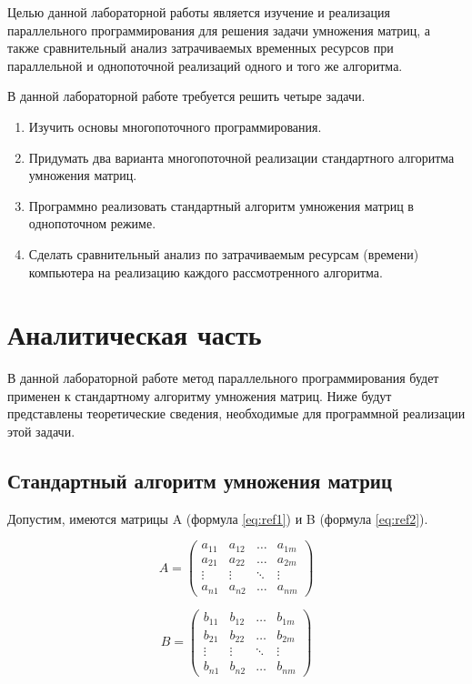 \documentclass[12pt]{report}
\begin{document}
	Целью данной лабораторной работы является изучение и реализация параллельного программирования для решения задачи умножения матриц, а также сравнительный анализ затрачиваемых временных ресурсов при параллельной и однопоточной реализаций одного и того же алгоритма.

В данной лабораторной работе требуется решить четыре задачи.
\begin{enumerate}
\item Изучить основы многопоточного программирования.
\item  Придумать два варианта многопоточной реализации стандартного алгоритма умножения матриц.
\item Программно реализовать стандартный алгоритм умножения матриц в однопоточном режиме.
\item Сделать сравнительный анализ по затрачиваемым ресурсам (времени) компьютера на реализацию каждого рассмотренного алгоритма.
\end{enumerate}


\chapter{Аналитическая часть}
 
 В данной лабораторной работе метод параллельного программирования будет применен к стандартному алгоритму умножения матриц. Ниже будут представлены теоретические сведения, необходимые для программной реализации этой задачи.
 
 \section{Стандартный алгоритм умножения матриц}
 
 Допустим, имеются матрицы A (формула \ref{eq:ref1}) и B (формула \ref{eq:ref2}).
 
 \begin{equation}
	A = \left(
	\begin{array}{cccc}
			a_{11} & a_{12} & \ldots & a_{1m} \\
			a_{21} & a_{22} & \ldots & a_{2m} \\
			\vdots & \vdots & \ddots & \vdots \\
			a_{n1} & a_{n2} & \ldots & a_{nm}
		\end{array}
	\right)
	\label{eq:ref1}
\end{equation}

\begin{equation}
	B = \left(
	\begin{array}{cccc}
			b_{11} & b_{12} & \ldots & b_{1m} \\
			b_{21} & b_{22} & \ldots & b_{2m} \\
			\vdots & \vdots & \ddots & \vdots \\
			b_{n1} & b_{n2} & \ldots & b_{nm}
		\end{array}
	\right)
	\label{eq:ref2}
\end{equation}
\end{document}
